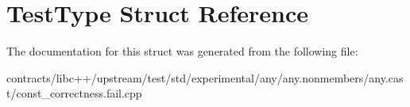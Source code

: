 \hypertarget{struct_test_type}{}\section{Test\+Type Struct Reference}
\label{struct_test_type}


The documentation for this struct was generated from the following file\+:\begin{DoxyCompactItemize}
\item 
contracts/libc++/upstream/test/std/experimental/any/any.\+nonmembers/any.\+cast/const\+\_\+correctness.\+fail.\+cpp\end{DoxyCompactItemize}
